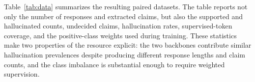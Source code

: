 \documentclass[conference,a4paper]{IEEEtran}
\begin{document}
Table~\ref{tab:data} summarizes the resulting paired datasets. The table reports not only the number of responses and extracted claims, but also the supported and hallucinated counts, undecided claims, hallucination rates, supervised-token coverage, and the positive-class weights used during training. These statistics make two properties of the resource explicit: the two backbones contribute similar hallucination prevalences despite producing different response lengths and claim counts, and the class imbalance is substantial enough to require weighted supervision.

\begin{table}[ht]

\centering

\small

\caption{Statistics of the two native Persian uncertainty datasets.}

\label{tab:data}


\end{table}
\end{document}
